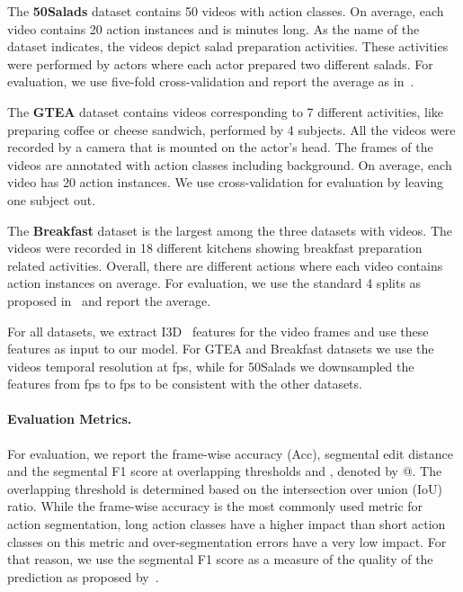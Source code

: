 \documentclass[10pt,twocolumn,letterpaper]{article}
\begin{document}
The \textbf{50Salads} dataset contains 50 videos with  action classes. 
On average, each video contains 20 action instances and is  minutes long. 
As the name of the dataset indicates, the videos depict salad preparation 
activities. These activities were performed by  actors where each actor 
prepared two different salads. For evaluation, we use five-fold cross-validation 
and report the average as in~\cite{stein2013combining}. 

The \textbf{GTEA} dataset contains  videos corresponding to 7 different 
activities, like preparing coffee or cheese sandwich, performed by 4 subjects. 
All the videos were recorded by a camera that is mounted on the actor's head. 
The frames of the videos are annotated with  action classes including 
background. On average, each video has 20 action instances. We use cross-validation 
for evaluation by leaving one subject out. 

The \textbf{Breakfast} dataset is the largest among the three datasets with 
 videos. The videos were recorded in 18 different kitchens showing 
breakfast preparation related activities. Overall, there are  different 
actions where each video contains  action instances on average. For evaluation, 
we use the standard 4 splits as proposed in~\cite{kuehne2014language} and report 
the average.

For all datasets, we extract I3D~\cite{carreira2017quo} features for the video  
frames and use these features as input to our model. For GTEA and Breakfast datasets
we use the videos temporal resolution at  fps, while for 50Salads we downsampled 
the features from  fps to  fps to be consistent with the other datasets.

\paragraph{Evaluation Metrics.} For evaluation, we report the frame-wise 
accuracy (Acc), segmental edit distance and the segmental F1 score at overlapping 
thresholds  and , denoted by @. The overlapping 
threshold is determined based on the intersection over union (IoU) ratio. While the 
frame-wise accuracy is the most commonly used metric for action segmentation, long 
action classes have a higher impact than short action classes on this metric and 
over-segmentation errors have a very low impact. For that reason, we use the segmental 
F1 score as a measure of the quality of the prediction as proposed by~\cite{Lea_2017_CVPR}.
\end{document}
